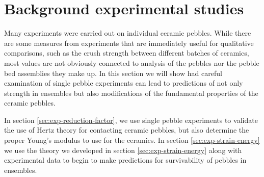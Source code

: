 \chapter{Background experimental studies}\label{sec:studies-experiments}

Many experiments were carried out on individual ceramic pebbles. While there are some measures from experiments that are immediately useful for qualitative comparisons, such as the crush strength between different batches of ceramics, most values are not obviously connected to analysis of the pebbles nor the pebble bed assemblies they make up. In this section we will show had careful examination of single pebble experiments can lead to predictions of not only strength in ensembles but also modifications of the fundamental properties of the ceramic pebbles.

In section \cref{sec:exp-reduction-factor}, we use single pebble experiments to validate the use of Hertz theory for contacting ceramic pebbles, but also determine the proper Young's modulus to use for the ceramics. In section \cref{sec:exp-strain-energy} we use the theory we developed in section \cref{sec:exp-strain-energy} along with experimental data to begin to make predictions for survivability of pebbles in ensembles.












